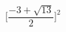 \documentclass[preview]{standalone}
\begin{document}
\begin{align*}
\big[ \dfrac{-3 + \sqrt{13} } {2} 
] ^2
\end{align*}
\end{document}
